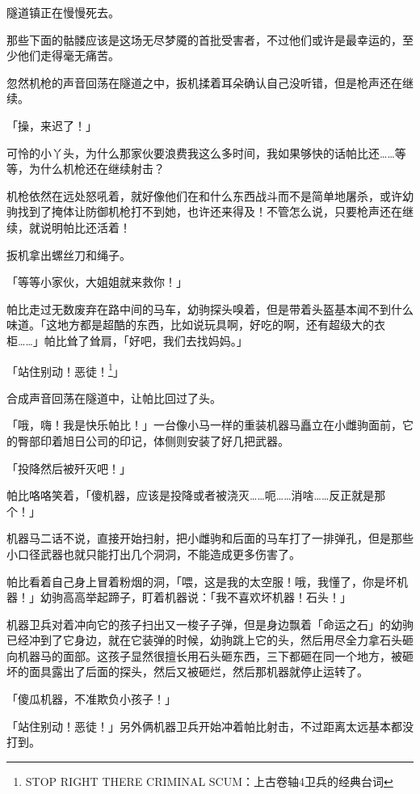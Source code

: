 隧道镇正在慢慢死去。

那些下面的骷髅应该是这场无尽梦魇的首批受害者，不过他们或许是最幸运的，至少他们走得毫无痛苦。

忽然机枪的声音回荡在隧道之中，扳机揉着耳朵确认自己没听错，但是枪声还在继续。

「操，来迟了！」

可怜的小丫头，为什么那家伙要浪费我这么多时间，我如果够快的话帕比还……等等，为什么机枪还在继续射击？

机枪依然在远处怒吼着，就好像他们在和什么东西战斗而不是简单地屠杀，或许幼驹找到了掩体让防御机枪打不到她，也许还来得及！不管怎么说，只要枪声还在继续，就说明帕比还活着！

扳机拿出螺丝刀和绳子。

「等等小家伙，大姐姐就来救你！」

\horizonline


帕比走过无数废弃在路中间的马车，幼驹探头嗅着，但是带着头盔基本闻不到什么味道。「这地方都是超酷的东西，比如说玩具啊，好吃的啊，还有超级大的衣柜……」帕比耸了耸肩，「好吧，我们去找妈妈。」

「站住别动！恶徒！\footnote{STOP RIGHT THERE CRIMINAL SCUM：上古卷轴4卫兵的经典台词}」

合成声音回荡在隧道中，让帕比回过了头。

「哦，嗨！我是快乐帕比！」一台像小马一样的重装机器马矗立在小雌驹面前，它的臀部印着旭日公司的印记，体侧则安装了好几把武器。

「投降然后被歼灭吧！」

帕比咯咯笑着，「傻机器，应该是投降或者被浇灭……呃……消啥……反正就是那个！」

机器马二话不说，直接开始扫射，把小雌驹和后面的马车打了一排弹孔，但是那些小口径武器也就只能打出几个洞洞，不能造成更多伤害了。

帕比看着自己身上冒着粉烟的洞，「喂，这是我的太空服！哦，我懂了，你是坏机器！」幼驹高高举起蹄子，盯着机器说：「我不喜欢坏机器！石头！」

机器卫兵对着冲向它的孩子扫出又一梭子子弹，但是身边飘着「命运之石」的幼驹已经冲到了它身边，就在它装弹的时候，幼驹跳上它的头，然后用尽全力拿石头砸向机器马的面部。这孩子显然很擅长用石头砸东西，三下都砸在同一个地方，被砸坏的面具露出了后面的探头，然后又被砸烂，然后那机器就停止运转了。

「傻瓜机器，不准欺负小孩子！」

「站住别动！恶徒！」另外俩机器卫兵开始冲着帕比射击，不过距离太远基本都没打到。

